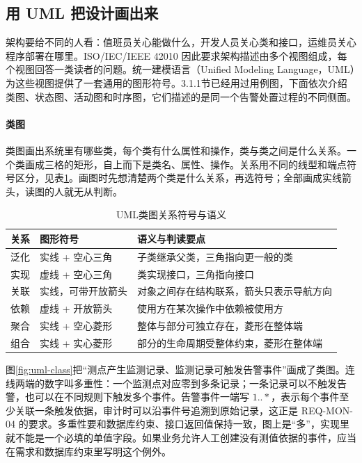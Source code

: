 \subsection{用 UML 把设计画出来}

架构要给不同的人看：值班员关心能做什么，开发人员关心类和接口，运维员关心程序部署在哪里。ISO/IEC/IEEE 42010 因此要求架构描述由多个视图组成，每个视图回答一类读者的问题\cite{ISO42010}。统一建模语言（Unified Modeling Language，UML）为这些视图提供了一套通用的图形符号。3.1.1节已经用过用例图，下面依次介绍类图、状态图、活动图和时序图，它们描述的是同一个告警处置过程的不同侧面。

\paragraph{类图}类图画出系统里有哪些类，每个类有什么属性和操作，类与类之间是什么关系。一个类画成三格的矩形，自上而下是类名、属性、操作。关系用不同的线型和端点符号区分，见表\ref{tab:uml-relations}。画图时先想清楚两个类是什么关系，再选符号；全部画成实线箭头，读图的人就无从判断。

\begin{table}[htbp]
\centering
\caption{UML类图关系符号与语义}
\label{tab:uml-relations}
\begin{tabular}{p{2.4cm}p{4.2cm}p{7.0cm}}
\toprule
关系 & 图形符号 & 语义与判读要点 \\
\midrule
泛化 & 实线 + 空心三角 & 子类继承父类，三角指向更一般的类 \\
实现 & 虚线 + 空心三角 & 类实现接口，三角指向接口 \\
关联 & 实线，可带开放箭头 & 对象之间存在结构联系，箭头只表示导航方向 \\
依赖 & 虚线 + 开放箭头 & 使用方在某次操作中依赖被使用方 \\
聚合 & 实线 + 空心菱形 & 整体与部分可独立存在，菱形在整体端 \\
组合 & 实线 + 实心菱形 & 部分的生命周期受整体约束，菱形在整体端 \\
\bottomrule
\end{tabular}
\end{table}

图\ref{fig:uml-class}把“测点产生监测记录、监测记录可触发告警事件”画成了类图。连线两端的数字叫多重性：一个监测点对应零到多条记录；一条记录可以不触发告警，也可以在不同规则下触发多个事件。告警事件一端写 $1..*$，表示每个事件至少关联一条触发依据，审计时可以沿事件号追溯到原始记录，这正是 REQ-MON-04 的要求。多重性要和数据库约束、接口返回值保持一致，图上是“多”，实现里就不能是一个必填的单值字段。如果业务允许人工创建没有测值依据的事件，应当在需求和数据库约束里写明这个例外。

